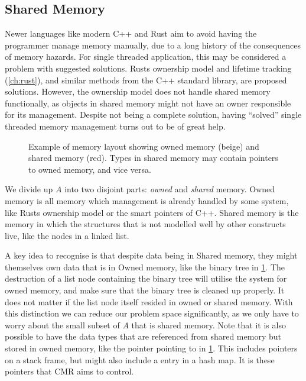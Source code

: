 \subsection{Shared Memory}

Newer languages like modern C++ and Rust aim to avoid having the programmer manage memory manually,
due to a long history of the consequences of memory hazards. For single threaded application, this
may be considered a problem with suggested solutions. Rusts ownership model and lifetime tracking
(\cref{ch:rust}), and similar methods from the C++ standard library, are proposed solutions.
However, the ownership model does not handle shared memory functionally, as objects in shared
memory might not have an owner responsible for its management. Despite not being a complete
solution, having ``solved'' single threaded memory management turns out to be of great help.

\begin{figure}[ht]
  \centering
  
  \caption{Example of memory layout showing owned memory (beige) and shared memory (red). Types in
  shared memory may contain pointers to owned memory, and vice versa.\label{fig:rust-shared-mem}}
\end{figure}

We divide up $A$ into two disjoint parts: \emph{owned} and \emph{shared} memory.  Owned memory is
all memory which management is already handled by some system, like Rusts ownership model or the
smart pointers of C++. Shared memory is the memory in which the structures that is not modelled well
by other constructs live, like the nodes in a linked list.

A key idea to recognise is that despite data being in Shared memory, they might themselves own data
that is in Owned memory, like the binary tree in \cref{fig:rust-shared-mem}. The destruction of a
list node containing the binary tree will utilise the system for owned memory, and make sure that
the binary tree is cleaned up properly. It does not matter if the list node itself resided in owned
or shared memory.  With this distinction we can reduce our problem space significantly, as we only
have to worry about the small subset of $A$ that is shared memory.  Note that it is also possible
to have the data types that are referenced from shared memory but stored in owned memory, like the
pointer pointing to  in \cref{fig:rust-shared-mem}.  This includes pointers on a stack
frame, but might also include a entry in a hash map. It is these pointers that CMR aims to control.



